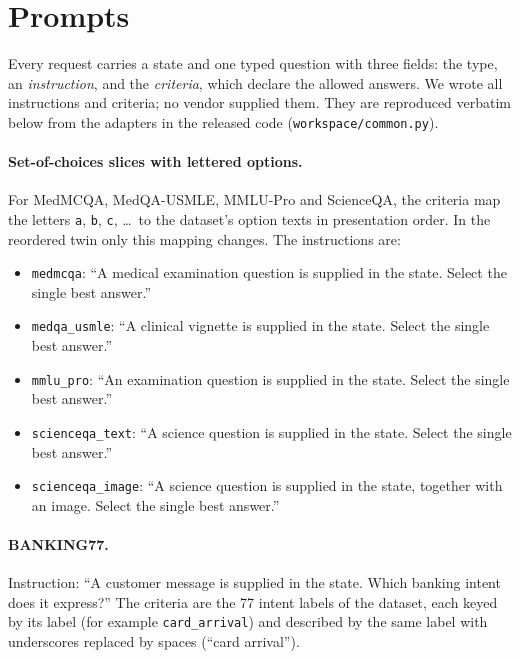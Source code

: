 \section{Prompts}
\label{app:prompts}

Every request carries a state and one typed question with three fields: the
type, an \emph{instruction}, and the \emph{criteria}, which declare the allowed
answers. We wrote all instructions and criteria; no vendor supplied them. They
are reproduced verbatim below from the adapters in the released code
(\texttt{workspace/common.py}).

\paragraph{Set-of-choices slices with lettered options.} For MedMCQA,
MedQA-USMLE, MMLU-Pro and ScienceQA, the criteria map the letters \texttt{a},
\texttt{b}, \texttt{c}, \dots\ to the dataset's option texts in presentation
order. In the reordered twin only this mapping changes. The instructions are:
\begin{itemize}
  \item \texttt{medmcqa}: ``A medical examination question is supplied in the
  state. Select the single best answer.''
  \item \texttt{medqa\_usmle}: ``A clinical vignette is supplied in the state.
  Select the single best answer.''
  \item \texttt{mmlu\_pro}: ``An examination question is supplied in the state.
  Select the single best answer.''
  \item \texttt{scienceqa\_text}: ``A science question is supplied in the state.
  Select the single best answer.''
  \item \texttt{scienceqa\_image}: ``A science question is supplied in the state,
  together with an image. Select the single best answer.''
\end{itemize}

\paragraph{BANKING77.} Instruction: ``A customer message is supplied in the
state. Which banking intent does it express?'' The criteria are the 77 intent
labels of the dataset, each keyed by its label (for example
\texttt{card\_arrival}) and described by the same label with underscores
replaced by spaces (``card arrival'').

